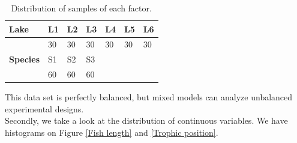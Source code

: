 \documentclass{article}
\begin{document}
\begin{table}[h!]
   \centering
    \begin{tabular}{ |p{2cm}||p{2cm}|p{2cm}|p{2cm}|p{2cm}|p{2cm}|p{2cm}|}
    \hline
    \textbf{Lake} & L1 & L2 & L3 & L4 & L5 & L6 \\
    \hline
     & 30 & 30 & 30 & 30 & 30 & 30\\ 
    \hline
    \hline
    \textbf{Species} & S1 & S2 & S3 & & & \\
    \cline{1-4}
     & 60 & 60 & 60 & & & \\
     \hline
    \end{tabular}
    \caption{Distribution of samples of each factor.}
    \label{Tableau AIC}
\end{table}
This data set is perfectly balanced, but mixed models can analyze unbalanced experimental designs.\\
Secondly, we take a look at the distribution of continuous variables. We have histograms on Figure \ref{Fish length} and \ref{Trophic position}.
\end{document}
